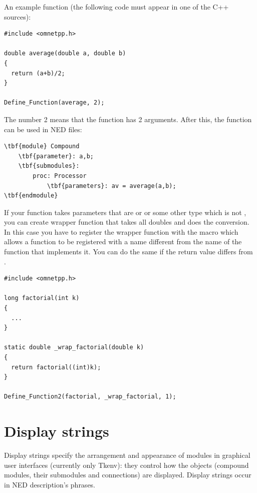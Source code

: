 An example function (the following code must appear in one of the C++
sources):


\begin{verbatim}
#include <omnetpp.h>

double average(double a, double b)
{
  return (a+b)/2;
}

Define_Function(average, 2);
\end{verbatim}


The number 2 means that the  function has 2
arguments.  After this, the  function can be used in
NED files:


\begin{Verbatim}[commandchars=\\\{\}]
\tbf{module} Compound
    \tbf{parameter}: a,b;
    \tbf{submodules}:
        proc: Processor
            \tbf{parameters}: av = average(a,b);
\tbf{endmodule}
\end{Verbatim}


If your function takes parameters that are  or  or
some other type which is not , you can create wrapper function
that takes all doubles and does the conversion. In this case you have
to register the wrapper function with the  macro
which allows a function to be registered with a name different from the
name of the function that implements it. You can do the same
if the return value differs from .

\begin{verbatim}
#include <omnetpp.h>

long factorial(int k)
{
  ...
}

static double _wrap_factorial(double k)
{
  return factorial((int)k);
}

Define_Function2(factorial, _wrap_factorial, 1);
\end{verbatim}


\section{Display strings}
\label{sec:ch-ned-lang:display-strings}

Display strings specify the arrangement and
appearance of modules in graphical user interfaces (currently only
Tkenv): they control how the objects (compound modules, their
submodules and connections) are displayed. Display strings occur in
NED description's 
phrases.


